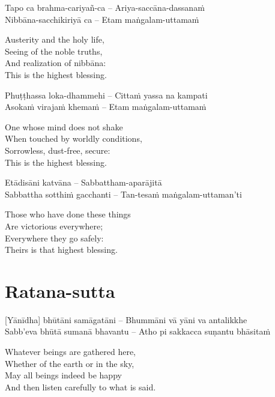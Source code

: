 Tapo ca brahma-cariyañ-ca – Ariya-saccāna-dassanaṁ\\
Nibbāna-sacchikiriyā ca – Etam maṅgalam-uttamaṁ

\begin{english}
  Austerity and the holy life,\\
  Seeing of the noble truths,\\
  And realization of nibbāna:\\
  This is the highest blessing.
\end{english}

Phuṭṭhassa loka-dhammehi – Cittaṁ yassa na kampati\\
Asokaṁ virajaṁ khemaṁ – Etam maṅgalam-uttamaṁ

\begin{english}
  One whose mind does not shake\\
  When touched by worldly conditions,\\
  Sorrowless, dust-free, secure:\\
  This is the highest blessing.
\end{english}

Etādisāni katvāna – Sabbattham-aparājitā\\
Sabbattha sotthiṁ gacchanti – Tan-tesaṁ maṅgalam-uttaman'ti

\begin{english}
  Those who have done these things\\
  Are victorious everywhere;\\
  Everywhere they go safely:\\
  Theirs is that highest blessing.
\end{english}
\suttaRef{[Snp 2.4]}

\section{Ratana-sutta}
\label{ratana-sutta}
[Yānīdha] bhūtāni samāgatāni – Bhummāni vā yāni va antalikkhe\\
Sabb'eva bhūtā sumanā bhavantu – Atho pi sakkacca suṇantu bhāsitaṁ

\begin{english}
  Whatever beings are gathered here,\\
  Whether of the earth or in the sky,\\
  May all beings indeed be happy\\
  And then listen carefully to what is said.
\end{english}

